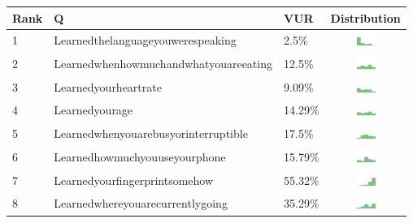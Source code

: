 \begin{table}[t]
\begin{center}
\small
\begin{tabular}{| p{0.5cm} | p{7cm} | p{1cm} | c |}
\hline
 Rank & Q &  VUR & Distribution  \\ 
\hline
1 & Learnedthelanguageyouwerespeaking & 2.5\% & \includegraphics[width = 2cm, height = 0.5cm]{../learnedthelanguageyouwerespeakingAPPSERVER} \\ \hline 
2 & Learnedwhenhowmuchandwhatyouareeating & 12.5\% & \includegraphics[width = 2cm, height = 0.5cm]{../learnedwhenhowmuchandwhatyouareeatingAPPSERVER} \\ \hline 
3 & Learnedyourheartrate & 9.09\% & \includegraphics[width = 2cm, height = 0.5cm]{../learnedyourheartrateAPPSERVER} \\ \hline 
4 & Learnedyourage & 14.29\% & \includegraphics[width = 2cm, height = 0.5cm]{../learnedyourageAPPSERVER} \\ \hline 
5 & Learnedwhenyouarebusyorinterruptible & 17.5\% & \includegraphics[width = 2cm, height = 0.5cm]{../learnedwhenyouarebusyorinterruptibleAPPSERVER} \\ \hline 
6 & Learnedhowmuchyouuseyourphone & 15.79\% & \includegraphics[width = 2cm, height = 0.5cm]{../learnedhowmuchyouuseyourphoneAPPSERVER} \\ \hline 
7 & Learnedyourfingerprintsomehow & 55.32\% & \includegraphics[width = 2cm, height = 0.5cm]{../learnedyourfingerprintsomehowAPPSERVER} \\ \hline 
8 & Learnedwhereyouarecurrentlygoing & 35.29\% & \includegraphics[width = 2cm, height = 0.5cm]{../learnedwhereyouarecurrentlygoingAPPSERVER} \\ \hline 

\end{tabular}
\end{center}
\end{table}
